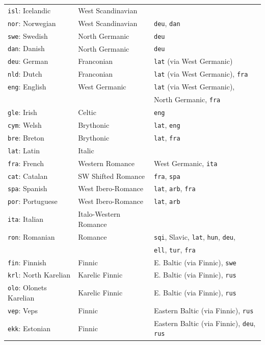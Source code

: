 \begin{center}
\begin{longtable}{lll}
\texttt{isl}: Icelandic & West Scandinavian & \\
\texttt{nor}: Norwegian & West Scandinavian & \texttt{deu}, \texttt{dan}\\
\texttt{swe}: Swedish & North Germanic & \texttt{deu}\\
\texttt{dan}: Danish & North Germanic & \texttt{deu}\\
\texttt{deu}: German & Franconian & \texttt{lat} (via West Germanic)\\
\texttt{nld}: Dutch & Franconian & \texttt{lat} (via West Germanic), \texttt{fra}\\
\texttt{eng}: English & West Germanic & \texttt{lat} (via West Germanic),\\
 & & North Germanic, \texttt{fra}\\
\texttt{gle}: Irish & Celtic & \texttt{eng}\\
\texttt{cym}: Welsh & Brythonic & \texttt{lat}, \texttt{eng}\\
\texttt{bre}: Breton & Brythonic & \texttt{lat}, \texttt{fra}\\
\texttt{lat}: Latin & Italic & \\
\texttt{fra}: French & Western Romance & West Germanic, \texttt{ita}\\
\texttt{cat}: Catalan & SW Shifted Romance & \texttt{fra}, \texttt{spa}\\
\texttt{spa}: Spanish & West Ibero-Romance & \texttt{lat}, \texttt{arb}, \texttt{fra}\\
\texttt{por}: Portuguese & West Ibero-Romance & \texttt{lat}, \texttt{arb}\\
\texttt{ita}: Italian & Italo-Western Romance & \\
\texttt{ron}: Romanian & Romance & \texttt{sqi}, Slavic, \texttt{lat}, \texttt{hun}, \texttt{deu},\\
 & & \texttt{ell}, \texttt{tur}, \texttt{fra}\\
\hline
\texttt{fin}: Finnish & Finnic & E. Baltic (via Finnic), \texttt{swe}\\
\texttt{krl}: North Karelian & Karelic Finnic & E. Baltic (via Finnic), \texttt{rus}\\
\texttt{olo}: Olonets Karelian & Karelic Finnic & E. Baltic (via Finnic), \texttt{rus}\\
\texttt{vep}: Veps & Finnic & Eastern Baltic (via Finnic), \texttt{rus}\\
\texttt{ekk}: Estonian & Finnic & Eastern Baltic (via Finnic), \texttt{deu}, \texttt{rus}\\

\end{longtable}
\end{center}
